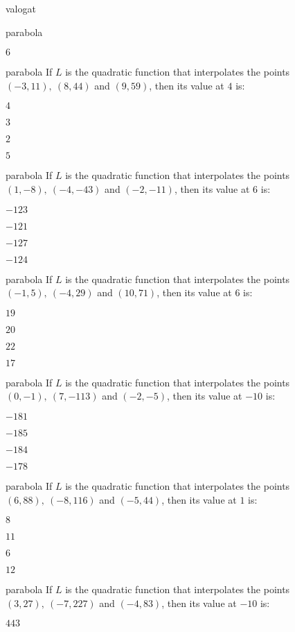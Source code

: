\documentclass[12pt]{article}
\begin{document}
\begin{quiz}{valogat}
\begin{multi}{parabola}
\item  $ 6 $
\end{multi}
\begin{multi}{parabola}
If $L$ is the quadratic function that interpolates the points
$(-3,11),\ (8,44)$ and $(9,59)$, then its value at $4$ is:
\item* $ 4 $
\item  $ 3 $
\item  $ 2 $
\item  $ 5 $
\end{multi}
\begin{multi}{parabola}
If $L$ is the quadratic function that interpolates the points
$(1,-8),\ (-4,-43)$ and $(-2,-11)$, then its value at $6$ is:
\item* $ -123 $
\item  $ -121 $
\item  $ -127 $
\item  $ -124 $
\end{multi}
\begin{multi}{parabola}
If $L$ is the quadratic function that interpolates the points
$(-1,5),\ (-4,29)$ and $(10,71)$, then its value at $6$ is:
\item* $ 19 $
\item  $ 20 $
\item  $ 22 $
\item  $ 17 $
\end{multi}
\begin{multi}{parabola}
If $L$ is the quadratic function that interpolates the points
$(0,-1),\ (7,-113)$ and $(-2,-5)$, then its value at $-10$ is:
\item* $ -181 $
\item  $ -185 $
\item  $ -184 $
\item  $ -178 $
\end{multi}
\begin{multi}{parabola}
If $L$ is the quadratic function that interpolates the points
$(6,88),\ (-8,116)$ and $(-5,44)$, then its value at $1$ is:
\item* $ 8 $
\item  $ 11 $
\item  $ 6 $
\item  $ 12 $
\end{multi}
\begin{multi}{parabola}
If $L$ is the quadratic function that interpolates the points
$(3,27),\ (-7,227)$ and $(-4,83)$, then its value at $-10$ is:
\item* $ 443 $

\end{multi}
\end{quiz}
\end{document}

